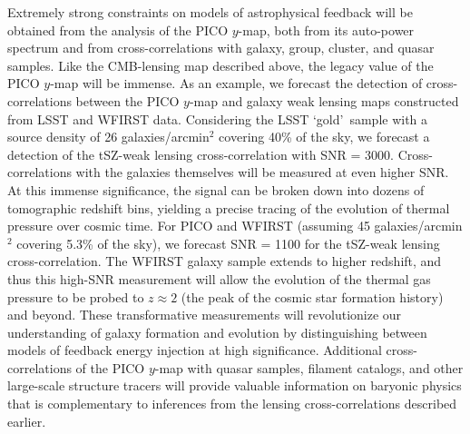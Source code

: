 \documentclass[PICOReport.tex]{subfiles}
\begin{document}
Extremely strong constraints on models of astrophysical feedback will be obtained from the analysis of the PICO $y$-map, both from its auto-power spectrum and from cross-correlations with galaxy, group, cluster, and quasar samples.  Like the CMB-lensing map described above, the legacy value of the PICO $y$-map will be immense.  As an example, we forecast the detection of cross-correlations between the PICO $y$-map and galaxy weak lensing maps constructed from LSST and WFIRST data.  Considering the LSST \lq gold\rq~sample with a source density of 26 galaxies/arcmin${}^2$ covering 40\% of the sky, we forecast a detection of the tSZ-weak lensing cross-correlation with \ac{SNR} = 3000.  Cross-correlations with the galaxies themselves will be measured at even higher \ac{SNR}.  At this immense significance, the signal can be broken down into dozens of tomographic redshift bins, yielding a precise tracing of the evolution of thermal pressure over cosmic time.  For PICO and WFIRST (assuming 45 galaxies/arcmin${}^2$ covering 5.3\% of the sky), we forecast \ac{SNR} = 1100 for the tSZ-weak lensing cross-correlation.  The WFIRST galaxy sample extends to higher redshift, and thus this high-\ac{SNR} measurement will allow the evolution of the thermal gas pressure to be probed to $z \approx 2$ (the peak of the cosmic star formation history) and beyond.  These transformative measurements will revolutionize our understanding of galaxy formation and evolution by distinguishing between models of feedback energy injection at high significance.  Additional cross-correlations of the PICO $y$-map with quasar samples, filament catalogs, and other large-scale structure tracers will provide valuable information on baryonic physics that is complementary to inferences from the lensing cross-correlations described earlier. %
\end{document}
